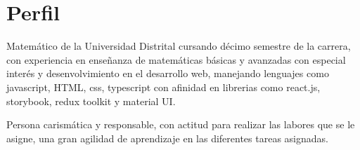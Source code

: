 \documentclass[letterpaper]{twentysecondcv} %
\begin{document}
\makeprofile %

\begin{center}
\end{center}
\section{Perfil}
Matemático de la Universidad Distrital cursando décimo semestre de la carrera, con
experiencia en enseñanza de matemáticas básicas y avanzadas con especial interés y desenvolvimiento en el desarrollo web, manejando lenguajes como javascript, HTML, css, typescript con afinidad en librerias como react.js, storybook, redux toolkit y material UI.

Persona carismática y responsable, con actitud para realizar las labores que se le asigne, una gran agilidad de aprendizaje en las diferentes tareas asignadas.
\end{document}
